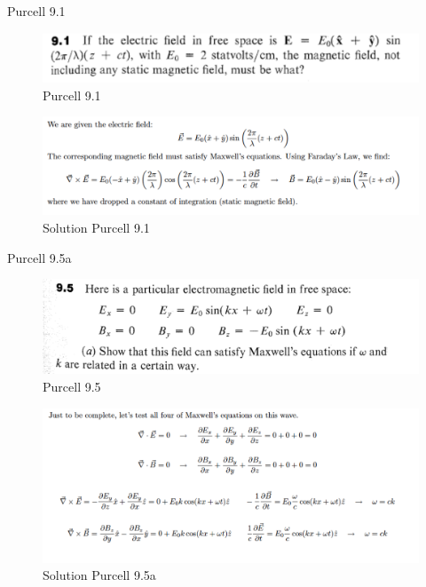 \documentclass[makesolutionspdf]{esg8022pset}
\begin{document}
\begin{problem}{Purcell 9.1}

\begin{figure}[H]
    \centering
    \includegraphics[width = 15cm]{pu901}
    \caption{Purcell 9.1}
  \end{figure}
  \end{problem}
\begin{solution}
  \begin{figure}[H]
    \centering
    \includegraphics[width = 15cm]{solpu901}
    \caption{Solution Purcell 9.1}
  \end{figure}
\end{solution}


\begin{problem}{Purcell 9.5a}
 \begin{figure}[H]
    \centering
    \includegraphics[width = 15cm]{pu905}
    \caption{Purcell 9.5}
  \end{figure}
\end{problem}
\begin{solution}
 \begin{figure}[H]
    \centering
    \includegraphics[width = 15cm]{solpu905a}
    \caption{Solution Purcell 9.5a}
  \end{figure}
\end{solution}
\end{document}
